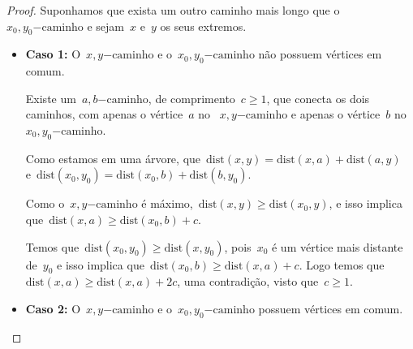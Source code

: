 \documentclass[a4paper,12pt]{article}
\newcommand{\caminho}{\mathrm{-caminho}}
\newcommand{\dist}{\mathrm{dist}}
\begin{document}
	\begin{proof}
		Suponhamos que exista um outro caminho mais longo que 
		o~$x_0,y_0\caminho$ e sejam~$x$ e~$y$ os seus extremos.

		\begin{itemize}
	        \item \textbf{Caso 1:} O~$x,y\caminho$ e 
	        o~$x_0,y_0\caminho$ não possuem vértices em comum.

	        Existe um~$a,b\caminho$, de 
	        comprimento~$c \ge 1$, que conecta os dois caminhos, 
	        com apenas o vértice~$a$ 
	        no ~$x,y\caminho$ e apenas o vértice~$b$ 
	        no~$x_0,y_0\caminho$.

	        \begin{center}  \end{center}


	        Como estamos em uma árvore,
	        que~${\dist(x,y) =\dist(x,a)+\dist(a,y)}$
	        e~${\dist(x_0,y_0) =\dist(x_0,b)+\dist(b,y_0)}$.

	        Como o~$x,y\caminho$ é 
	        máximo,~${\dist(x,y)\ge \dist(x_0,y)}$,
	        e isso implica que~${\dist(x,a)\ge \dist(x_0,b)+c}$.
 			
 			Temos que~${\dist(x_0,y_0)\ge \dist(x,y_0)}$,
	        pois~$x_0$ é um vértice mais distante de~$y_0$ e isso implica 
	        que~${\dist(x_0,b)\ge \dist(x,a)+c}$.
	        Logo temos 
	        que~${\dist(x,a)\ge \dist(x, a)+2c}$,
	        uma contradição, visto que~${c\ge 1}$.


			\bigskip
			\bigskip
			\bigskip


			\item \textbf{Caso 2:} O~$x,y\caminho$ e 
			o~$x_0,y_0\caminho$ possuem vértices em comum.


\end{itemize}
\end{proof}
\end{document}
